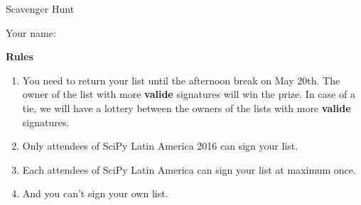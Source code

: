 \documentclass[12pt]{article}
\begin{document}
\thispagestyle{empty}

\vspace*{4cm}

\begin{center}
  \Huge Scavenger Hunt
\end{center}

Your name: \hrulefill

\begin{center}
  \textbf{Rules}
\end{center}

\begin{enumerate}
  \item You need to return your list until the afternoon break on May 20th.
    The owner of the list with more \textbf{valide} signatures will win the prize.
    In case of a tie, we will have a lottery between the owners of the lists
    with more \textbf{valide} signatures.
  \item Only attendees of SciPy Latin America 2016 can sign your list.
  \item Each attendees of SciPy Latin America can sign your list at maximum once.
  \item And you can't sign your own list.
\end{enumerate}
\end{document}
